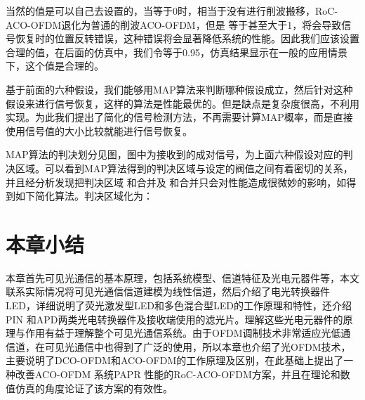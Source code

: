 当然的值是可以自己去设置的，当等于0时，相当于没有进行削波搬移，RoC-ACO-OFDM退化为普通的削波ACO-OFDM，但是 等于甚至大于1，将会导致信号恢复时的位置反转错误，这种错误将会显著降低系统的性能。因此我们应该设置合理的值，在后面的仿真中，我们令等于0.95，仿真结果显示在一般的应用情景下，这个值是合理的。

基于前面的六种假设，我们能够用MAP算法来判断哪种假设成立，然后针对这种假设来进行信号恢复，这样的算法是性能最优的。但是缺点是复杂度很高，不利用实现。为此我们提出了简化的信号检测方法，不再需要计算MAP概率，而是直接使用信号值的大小比较就能进行信号恢复。

MAP算法的判决划分见图，图中为接收到的成对信号，为上面六种假设对应的判决区域。可以看到MAP算法得到的判决区域与设定的阀值之间有着密切的关系，并且经分析发现把判决区域 和合并及 和合并只会对性能造成很微妙的影响，如得到如下简化算法。判决区域化为：
\section{本章小结}
本章首先可见光通信的基本原理，包括系统模型、信道特征及光电元器件等，本文联系实际情况将可见光通信信道建模为线性信道，然后介绍了电光转换器件LED，详细说明了荧光激发型LED和多色混合型LED的工作原理和特性，还介绍PIN 和APD两类光电转换器件及接收端使用的滤光片。理解这些光电元器件的原理与作用有益于理解整个可见光通信系统。由于OFDM调制技术非常适应光低通信道，在可见光通信中也得到了广泛的使用，所以本章也介绍了光OFDM技术，主要说明了DCO-OFDM和ACO-OFDM的工作原理及区别，在此基础上提出了一种改善ACO-OFDM 系统PAPR 性能的RoC-ACO-OFDM方案，并且在理论和数值仿真的角度论证了该方案的有效性。
